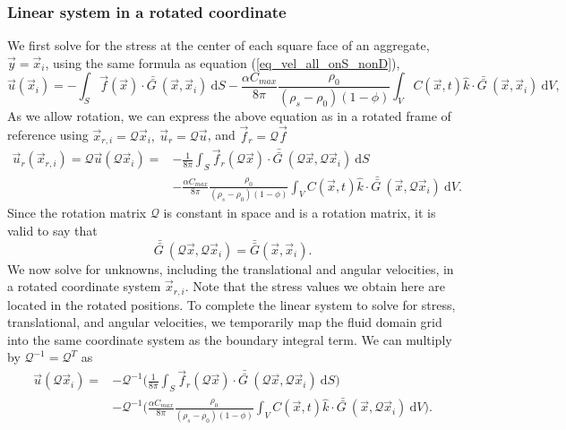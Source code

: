 \subsubsection{Linear system in a rotated coordinate}
We first solve for the stress at the center of each square face of an aggregate, $\vec{y} = \vec{x}_i$, 
using the same formula as equation (\ref{eq_vel_all_onS_nonD}),
\begin{equation}
	\vec{u} \left(\vec{x}_i \right) 
		  = -\int_{S}  
		 \vec{f}(\vec{x}) 
		 \cdot \bar{\bar{G \ }} (\vec{x}, \vec{x}_i) 
		 \ \textrm{d}S 
		 - \frac{ \alpha C_{max}}{8\pi } \frac{\rho_0}{(\rho_s - \rho_0)(1-\phi)}
		 \int_V  C \left(\vec{x} ,t \right) \hat{k} \cdot
		 \bar{\bar{G \ }}(\vec{x}, \vec{x}_i)
		 \ \text{d}V,
		 \nonumber
\end{equation}
As we allow rotation, we can express the above equation as in a rotated frame of reference using $\vec{x}_{r, i} = \mathcal{Q} \vec{x}_i, \ \vec{u}_r = \mathcal{Q} \vec{u}$, and $\vec{f}_r = \mathcal{Q} \vec{f}$
\begin{align}
	\vec{u}_r(\vec{x}_{r, i}) =
	\mathcal{Q}
	\vec{u} \left(\mathcal{Q} \vec{x}_i \right) 
		  = & - \frac{1}{8 \pi} \int_{S}  
		 \vec{f}_r(\mathcal{Q} \vec{x}) 
		 \cdot \bar{\bar{G \ }} (\mathcal{Q} \vec{x},\mathcal{Q}\vec{x}_i) 
		 \ \textrm{d}S
		 \nonumber \\
		 & - \frac{ \alpha C_{max}}{8\pi } \frac{\rho_0}{(\rho_s - \rho_0)(1-\phi)}
		 \int_V  C \left(\vec{x} ,t \right) \hat{k} \cdot
		 \bar{\bar{G \ }}(\vec{x}, \mathcal{Q} \vec{x}_i)
		 \ \text{d}V.
	\label{eq_slp_On_rotate}
\end{align}
Since the rotation matrix $\mathcal{Q}$ is constant in space and is a rotation matrix, it is valid to say that
\[
 \bar{\bar{G \ }} (\mathcal{Q} \vec{x},\mathcal{Q}\vec{x}_i) 
	 = \bar{\bar{G}}( \vec{x}, \vec{x}_i).
\]
We now solve for unknowns, including the translational and angular velocities,
in a rotated coordinate system $\vec{x}_{r,i} $.
Note that the stress values we obtain here 
are located in the rotated positions.  
To complete the linear system to solve for stress, translational, and angular velocities, we temporarily map the fluid domain grid into the same coordinate system as the boundary integral term.
We can multiply by $\mathcal{Q}^{-1} = \mathcal{Q}^{T}$ as 
\begin{align}
	 \vec{u} \left(\mathcal{Q} \vec{x}_i \right) 
		= &
		 -\mathcal{Q}^{-1}
		 \biggl(
		 \frac{1}{8 \pi} \int_{S}  
		 \vec{f}_r(\mathcal{Q} \vec{x}) 
		 \cdot \bar{\bar{G \ }} (\mathcal{Q} \vec{x},\mathcal{Q}\vec{x}_i) 
		 \ \textrm{d}S \biggl)
		 \nonumber \\  
		 & -\mathcal{Q}^{-1}
		 \biggl(
		 \frac{ \alpha C_{max}}{8\pi } \frac{\rho_0}{(\rho_s - \rho_0)(1-\phi)}
		 \int_V  C \left(\vec{x} ,t \right) \hat{k} \cdot
		 \bar{\bar{G \ }}(\vec{x}, \mathcal{Q} \vec{x}_i)
		 \ \text{d}V
		 \biggr).
	\label{eq_slp_vol_R}
\end{align}
